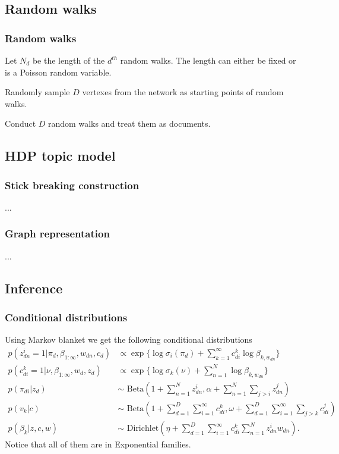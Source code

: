 \documentclass{beamer}
\begin{document}
\subsection{Random walks}
\begin{frame}
\frametitle{Random walks}
Let $N_d$ be the length of the $d^{th}$ random walks. The length can either be fixed or is a Poisson random variable.\\
\vspace{3mm}

Randomly sample $D$ vertexes from the network as starting points of random walks.\\
\vspace{3mm}

Conduct $D$ random walks and treat them as documents. 
\end{frame}

\subsection{HDP topic model}
\begin{frame}
\frametitle{Stick breaking construction}
...
\end{frame}

\begin{frame}
\frametitle{Graph representation}
...
\end{frame}

\subsection{Inference}
\begin{frame}
\frametitle{Conditional distributions}
Using Markov blanket we get the following conditional distributions
\begin{align*}
p(z_{dn}^i=1|\pi_d, \beta_{1:\infty},w_{dn},c_d) & \propto \exp\{\log\sigma_i(\pi_d)+\sum\limits_{k=1}^{\infty}c_{di}^k\log\beta_{k,w_{dn}}\}\\
p(c_{di}^k=1|\nu, \beta_{1:\infty},w_d, z_d) & \propto \exp\{\log\sigma_k(\nu)+\sum\limits_{n=1}^{N}\log\beta_{k,w_{dn}}\}\\
p(\pi_{di}|z_d) & \sim \text{ Beta}(1+\sum\limits_{n=1}^{N}z_{dn}^i, \alpha+\sum\limits_{n=1}^{N}\sum_{j>i}z_{dn}^j)\\
p(v_k|c) & \sim \text{ Beta}(1+\sum\limits_{d=1}^{D}\sum\limits_{i=1}^{\infty}c_{di}^k, \omega+\sum\limits_{d=1}^{D}\sum\limits_{i=1}^{\infty}\sum_{j>k}c_{di}^j)\\
p(\beta_k|z,c,w) & \sim \text{ Dirichlet}(\eta+\sum\limits_{d=1}^{D}\sum\limits_{i=1}^{\infty}c_{di}^k\sum\limits_{n=1}^{N}z_{dn}^iw_{dn}).
\end{align*}
Notice that all of them are in Exponential families.
\end{frame}
\end{document}

